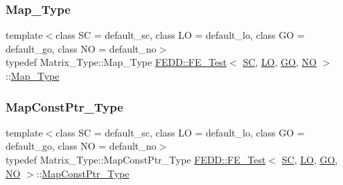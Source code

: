 \mbox{\label{classFEDD_1_1FE__Test_a416d3abf702e778eb7fab3cd1feb3ede}} 
\subsubsection{\texorpdfstring{Map\+\_\+\+Type}{Map\_Type}}
{\footnotesize\ttfamily template$<$class SC  = default\+\_\+sc, class LO  = default\+\_\+lo, class GO  = default\+\_\+go, class NO  = default\+\_\+no$>$ \\
typedef Matrix\+\_\+\+Type\+::\+Map\+\_\+\+Type \hyperlink{classFEDD_1_1FE__Test}{F\+E\+D\+D\+::\+F\+E\+\_\+\+Test}$<$ \hyperlink{fe__test__laplace_8cpp_a79c7e86a57edbb2a5a53242bcd04e41e}{SC}, \hyperlink{fe__test__laplace_8cpp_ad6a38c9f07d3fd633eefca5bccad8410}{LO}, \hyperlink{fe__test__laplace_8cpp_afa2946b509009b4f45eb04bd8c5b27d9}{GO}, \hyperlink{fe__test__laplace_8cpp_a5e24f37b28787429872b6ecb1d0417ce}{NO} $>$\+::\hyperlink{classFEDD_1_1FE__Test_a416d3abf702e778eb7fab3cd1feb3ede}{Map\+\_\+\+Type}}

\mbox{\label{classFEDD_1_1FE__Test_ad09d94cdf8e7574fc9b6d1648fa18826}} 
\subsubsection{\texorpdfstring{Map\+Const\+Ptr\+\_\+\+Type}{MapConstPtr\_Type}}
{\footnotesize\ttfamily template$<$class SC  = default\+\_\+sc, class LO  = default\+\_\+lo, class GO  = default\+\_\+go, class NO  = default\+\_\+no$>$ \\
typedef Matrix\+\_\+\+Type\+::\+Map\+Const\+Ptr\+\_\+\+Type \hyperlink{classFEDD_1_1FE__Test}{F\+E\+D\+D\+::\+F\+E\+\_\+\+Test}$<$ \hyperlink{fe__test__laplace_8cpp_a79c7e86a57edbb2a5a53242bcd04e41e}{SC}, \hyperlink{fe__test__laplace_8cpp_ad6a38c9f07d3fd633eefca5bccad8410}{LO}, \hyperlink{fe__test__laplace_8cpp_afa2946b509009b4f45eb04bd8c5b27d9}{GO}, \hyperlink{fe__test__laplace_8cpp_a5e24f37b28787429872b6ecb1d0417ce}{NO} $>$\+::\hyperlink{classFEDD_1_1FE__Test_ad09d94cdf8e7574fc9b6d1648fa18826}{Map\+Const\+Ptr\+\_\+\+Type}}

